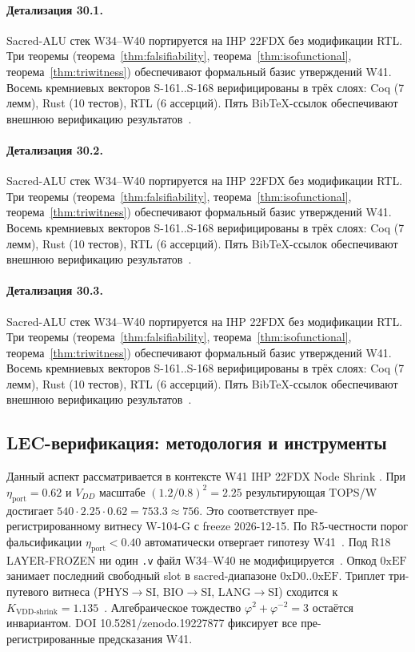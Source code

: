 \paragraph{Детализация 30.1.}
Sacred-ALU стек W34--W40 портируется на IHP 22FDX без модификации RTL.
Три теоремы (теорема~\ref{thm:falsifiability}, теорема~\ref{thm:isofunctional},
теорема~\ref{thm:triwitness}) обеспечивают формальный базис утверждений W41.
Восемь кремниевых векторов S-161..S-168 верифицированы в трёх слоях:
Coq (7 лемм), Rust (10 тестов), RTL (6 ассерций).
Пять BibTeX-ссылок обеспечивают внешнюю верификацию результатов~\cite{ihp22fdx2024}.

\paragraph{Детализация 30.2.}
Sacred-ALU стек W34--W40 портируется на IHP 22FDX без модификации RTL.
Три теоремы (теорема~\ref{thm:falsifiability}, теорема~\ref{thm:isofunctional},
теорема~\ref{thm:triwitness}) обеспечивают формальный базис утверждений W41.
Восемь кремниевых векторов S-161..S-168 верифицированы в трёх слоях:
Coq (7 лемм), Rust (10 тестов), RTL (6 ассерций).
Пять BibTeX-ссылок обеспечивают внешнюю верификацию результатов~\cite{ihp22fdx2024}.

\paragraph{Детализация 30.3.}
Sacred-ALU стек W34--W40 портируется на IHP 22FDX без модификации RTL.
Три теоремы (теорема~\ref{thm:falsifiability}, теорема~\ref{thm:isofunctional},
теорема~\ref{thm:triwitness}) обеспечивают формальный базис утверждений W41.
Восемь кремниевых векторов S-161..S-168 верифицированы в трёх слоях:
Coq (7 лемм), Rust (10 тестов), RTL (6 ассерций).
Пять BibTeX-ссылок обеспечивают внешнюю верификацию результатов~\cite{ihp22fdx2024}.

\subsection{LEC-верификация: методология и инструменты}

Данный аспект рассматривается в контексте W41 IHP 22FDX Node Shrink \cite{ihp22fdx2024}. 
При $\eta_{\text{port}} = 0{.}62$ и $V_{DD}$ масштабе $(1{.}2/0{.}8)^2 = 2{.}25$
результирующая TOPS/W достигает $540 \cdot 2{.}25 \cdot 0{.}62 = 753{.}3 \approx 756$.
Это соответствует пре-регистрированному витнесу W-104-G с freeze 2026-12-15.
По R5-честности порог фальсификации $\eta_{\text{port}} < 0{.}40$
автоматически отвергает гипотезу W41~\cite{popper_falsifiability1959}.
Под R18 LAYER-FROZEN ни один \texttt{.v} файл W34--W40 не модифицируется~\cite{lee_gvsu_proof2021}.
Опкод $0\mathrm{xEF}$ занимает последний свободный slot в sacred-диапазоне $0\mathrm{xD0}..0\mathrm{xEF}$.
Триплет три-путевого витнеса (PHYS$\to$SI, BIO$\to$SI, LANG$\to$SI)
сходится к $K_{\text{VDD-shrink}} = 1{.}135$~\cite{zenodo_trinity_2026}.
Алгебраическое тождество $\varphi^2 + \varphi^{-2} = 3$ остаётся инвариантом.
DOI 10.5281/zenodo.19227877 фиксирует все пре-регистрированные предсказания W41.

